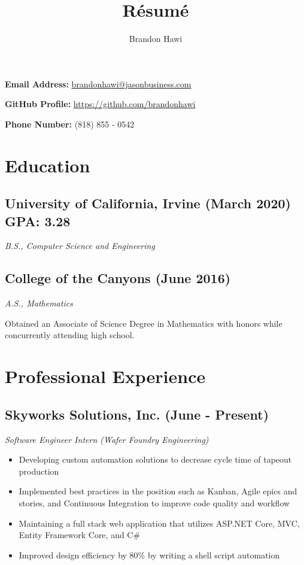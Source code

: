 \documentclass[10pt]{article}
\makeatletter
\renewcommand{\maketitle}
{
\huge
\noindent\textbf{\theauthor} \hfill \small{ \textbf{Email Address: }\href{mailto:brandonhawi@jasonbusiness.com}{brandonhawi@jasonbusiness.com}

\hfill \textbf{GitHub Profile: }\href{https://github.com/brandonhawi}{https://github.com/brandonhawi}

\hfill \textbf{Phone Number: }(818) 855 - 0542}}
\makeatother
\begin{document}
\title{R\'esum\'e}
\author{Brandon Hawi}

\maketitle
\vspace{-0.1in}
\section{Education}

\subsection{University of California, Irvine (March 2020) \hfill GPA: 3.28}
\noindent\textit{B.S., Computer Science and Engineering}

\subsection{College of the Canyons (June 2016)}
\noindent\textit{A.S., Mathematics}

Obtained an Associate of Science Degree in Mathematics with honors while concurrently attending
high school.

\section{Professional Experience}

\subsection{Skyworks Solutions, Inc. (June - Present)}

\noindent\textit{Software Engineer Intern (Wafer Foundry Engineering)}

\begin{itemize}
	\setlength\itemsep{0em}
	\item Developing custom automation solutions to decrease cycle time of tapeout production
	\item Implemented best practices in the position such as Kanban, Agile epics and stories, and Continuous Integration to improve code quality and workflow
	\item Maintaining a full stack web application that utilizes ASP.NET Core, MVC, Entity Framework Core, and C\#
	\item Improved design efficiency by 80\% by writing a shell script automation
\end{itemize}
\end{document}
